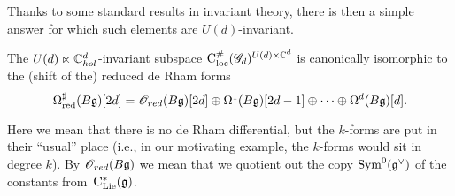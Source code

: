 
Thanks to some standard results in invariant theory, there is then a simple answer for which such elements are $U(d)$-invariant.

\begin{lem}
The $U(d) \ltimes \mathbb C^d_{hol}$-invariant subspace ${\rm C}_{\rm loc}^\#(\mathscr G_d)^{U(d) \ltimes \mathbb C^d}$
is canonically isomorphic to the (shift of the) reduced de Rham forms
\[
\Omega^\sharp_{\rm red}(B\mathfrak g) [2d] = \mathscr O_{red}(B \mathfrak g)[2d] \oplus \Omega^{1} (B \mathfrak g)[2d-1] \oplus \cdots \oplus \Omega^{d}(B \mathfrak g)[d]. 
\]
\end{lem}

Here we mean that there is no de Rham differential, 
but the $k$-forms are put in their ``usual'' place 
(i.e., in our motivating example, the $k$-forms would sit in degree $k$).
By $\mathscr O_{red}(B \mathfrak g)$ we mean that we quotient out the copy ${\rm Sym}^0(\mathfrak g^\vee)$ of the constants from~${\rm C}_{{\rm Lie}}^*(\mathfrak g)$.

